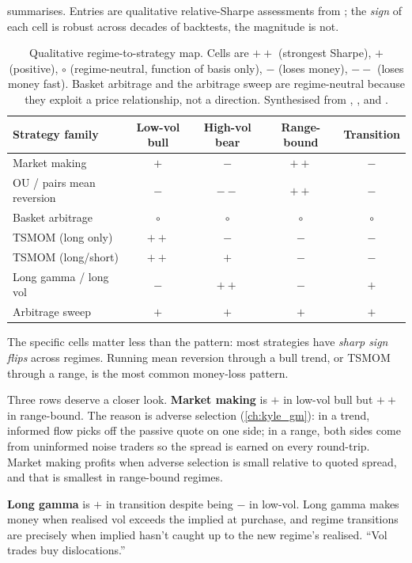  summarises. Entries are qualitative
relative-Sharpe assessments from \citeChan{,}\citeChanQT{}; the
\emph{sign} of each cell is robust across decades of backtests, the
magnitude is not.

\begin{table}[htbp]
\centering
\begin{tabular}{lcccc}
\toprule
Strategy family
  & Low-vol bull & High-vol bear
  & Range-bound & Transition \\
\midrule
Market making
  & $+$ & $-$ & $++$ & $-$ \\
OU / pairs mean reversion
  & $-$ & $--$ & $++$ & $-$ \\
Basket arbitrage
  & $\circ$ & $\circ$ & $\circ$ & $\circ$ \\
TSMOM (long only)
  & $++$ & $-$ & $-$ & $-$ \\
TSMOM (long/short)
  & $++$ & $+$ & $-$ & $-$ \\
Long gamma / long vol
  & $-$ & $++$ & $-$ & $+$ \\
Arbitrage sweep
  & $+$ & $+$ & $+$ & $+$ \\
\bottomrule
\end{tabular}
\caption{Qualitative regime-to-strategy map. Cells are
$++$ (strongest Sharpe), $+$ (positive), $\circ$ (regime-neutral,
function of basis only), $-$ (loses money), $--$ (loses money
fast). Basket arbitrage and the arbitrage sweep are regime-neutral
because they exploit a price relationship, not a direction.
Synthesised from \citeChan{}, \citeChanQT{}, and \citep{quantstart2016hmm}.}
\label{tab:wsw_regime_map}
\end{table}

The specific cells matter less than the pattern: most strategies have
\emph{sharp sign flips} across regimes. Running mean reversion
through a bull trend, or TSMOM through a range, is the most common
money-loss pattern.

Three rows deserve a closer look. \textbf{Market making} is $+$ in
low-vol bull but $++$ in range-bound. The reason is adverse
selection (\cref{ch:kyle_gm}): in a trend, informed flow picks off
the passive quote on one side; in a range, both sides come from
uninformed noise traders so the spread is earned on every
round-trip. Market making profits when adverse selection is small
relative to quoted spread, and that is smallest in range-bound
regimes.

\textbf{Long gamma} is $+$ in transition despite being $-$ in
low-vol. Long gamma makes money when realised vol exceeds the
implied at purchase, and regime transitions are precisely when
implied hasn't caught up to the new regime's realised. ``Vol trades
buy dislocations.''

